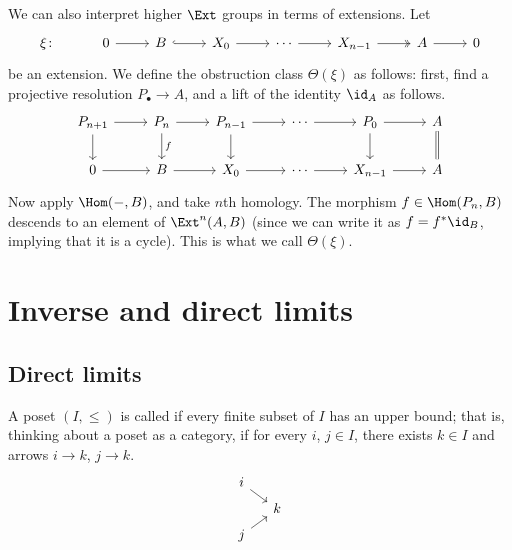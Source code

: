 \documentclass[main.tex]{subfiles}
\begin{document}
We can also interpret higher $\Ext$ groups in terms of extensions. Let
\begin{equation*}
  \begin{tikzcd}
    \xi\colon
    & 0
    \arrow[r]
    & B
    \arrow[r, hook]
    & X_{0}
    \arrow[r]
    & \cdots
    \arrow[r]
    & X_{n-1}
    \arrow[r, two heads]
    & A
    \arrow[r]
    & 0
  \end{tikzcd}
\end{equation*}
be an extension. We define the obstruction class $\Theta(\xi)$ as follows: first, find a projective resolution $P_{\bullet} \to A$, and a lift of the identity $\id_{A}$ as follows.
\begin{equation*}
  \begin{tikzcd}
    P_{n+1}
    \arrow[r]
    \arrow[d]
    & P_{n}
    \arrow[r]
    \arrow[d, "f"]
    & P_{n-1}
    \arrow[r]
    \arrow[d]
    & \cdots
    \arrow[r]
    & P_{0}
    \arrow[r]
    \arrow[d]
    & A
    \arrow[d, equals]
    \\
    0
    \arrow[r]
    & B
    \arrow[r]
    & X_{0}
    \arrow[r]
    & \cdots
    \arrow[r]
    & X_{n-1}
    \arrow[r]
    & A
  \end{tikzcd}
\end{equation*}
Now apply $\Hom(-, B)$, and take $n$th homology. The morphism $f \in \Hom(P_{n}, B)$ descends to an element of $\Ext^{n}(A, B)$ (since we can write it as $f = f^{*} \id_{B}$, implying that it is a cycle). This is what we call $\Theta(\xi)$.

\section{Inverse and direct limits}
\label{sec:inverse_and_direct_limits}

\subsection{Direct limits}
\label{ssc:direct_limits}

\begin{definition}
  \label{def:filtered_poset}
  A poset $(I, \leq)$ is called  if every finite subset of $I$ has an upper bound; that is, thinking about a poset as a category, if for every \(i\), \(j \in I\), there exists \(k \in I\) and arrows \(i \to k\), \(j \to k\).
  \begin{equation*}
    \begin{tikzcd}[row sep=tiny, column sep=small]
      i
      \arrow[dr]
      \\
      & k
      \\
      j
      \arrow[ur]
    \end{tikzcd}
  \end{equation*}
\end{definition}
\end{document}
